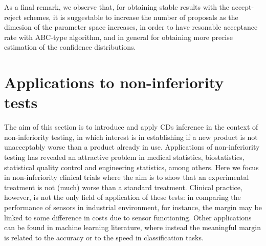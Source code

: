 \documentclass[preprint,12pt,authoryear]{elsarticle}
\begin{document}
As a final remark, we observe that, for obtaining stable results with the accept-reject schemes, it is suggestable to increase the number of proposals as the dimesion of the parameter space increases, in order to have resonable acceptance rate with ABC-type algorithm, and in general for obtaining more precise estimation of the confidence distributions.







 

\section{Applications to non-inferiority  tests}

The aim of this section is to introduce and apply CDs inference in the context of non-inferiority testing, in which interest is in establishing if a new product is not unacceptably worse than a product already in use. Applications of non-inferiority testing has revealed an attractive problem in  medical statistics, biostatistics, statistical quality control and engineering statistics, among others. Here we focus in non-inferiority clinical trials where the aim is to show that an experimental treatment is not (much) worse than a standard treatment. Clinical practice, however, is not the only field of application of these tests:  in comparing the performance of sensors in industrial environment, for instance, the  margin may be linked to some difference in costs due to  sensor functioning.
Other applications can be found in machine learning literature, where instead the meaningful
margin is related to the accuracy or to the speed in classification tasks.

 
\end{document}
